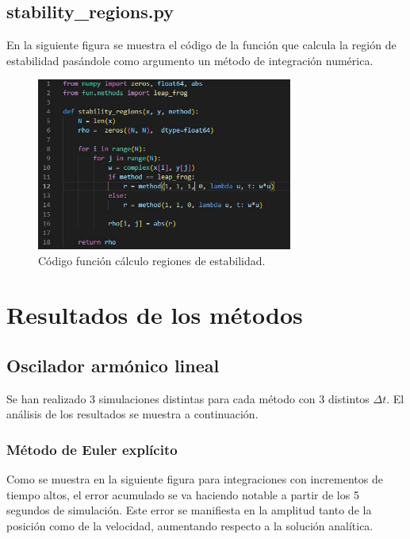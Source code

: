 \documentclass[12pt,a4paper]{article}
\begin{document}
\subsection{stability\_regions.py}
En la siguiente figura se muestra el código de la función que calcula la región de estabilidad pasándole como argumento un método de integración numérica.
\begin{figure}[H]
	\centering
	\includegraphics[width=0.75\textwidth]{FIGURES/mil4/codigo/st1.JPG}
	\caption{Código función cálculo regiones de estabilidad.}
	\label{st1}
\end{figure}


\section{Resultados de los métodos}

\subsection{Oscilador armónico lineal}
Se han realizado 3 simulaciones distintas para cada método con 3 distintos $\Delta t$. El análisis de los resultados se muestra a continuación.   

\subsubsection{Método de Euler explícito}
Como se muestra en la siguiente figura para integraciones con incrementos de tiempo altos, el error acumulado se va haciendo notable a partir de los 5 segundos de simulación. Este error se manifiesta en la amplitud tanto de la posición como de la velocidad, aumentando respecto a la solución analítica.
\end{document}
